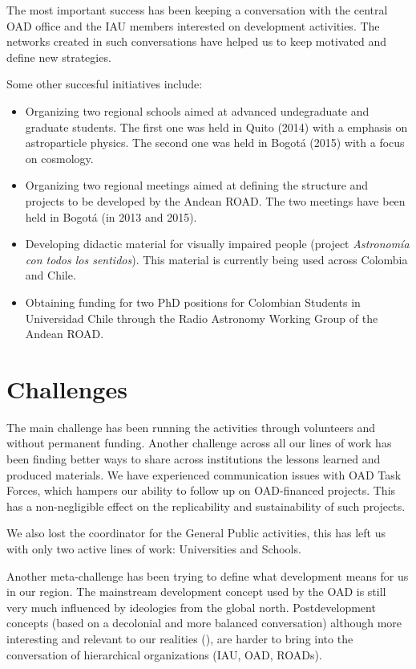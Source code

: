 \documentclass{iau}
\begin{document}
The most important success has been keeping a conversation with the
central OAD office and the IAU members interested on development
activities. 
The networks created in such conversations have helped us to keep
motivated and define new strategies.

Some other succesful initiatives include:
\begin{itemize}
\item Organizing two regional schools aimed at advanced undegraduate
  and graduate students. The first one was held in Quito (2014) with a
  emphasis on astroparticle physics. The second one was held in Bogot\'a (2015)
  with a focus on cosmology.
\item Organizing two regional meetings aimed at defining the structure
  and projects to be developed by the Andean ROAD. The two meetings
  have been held in Bogot\'a (in 2013 and 2015). 
\item Developing didactic material for visually impaired people
(project \emph{Astronom\'ia con todos los sentidos}). This
  material is currently being used across Colombia and Chile.
\item Obtaining funding for two PhD positions for Colombian Students
in Universidad Chile through the Radio Astronomy Working Group of the
Andean ROAD. 
\end{itemize}



\section{Challenges}

The main challenge has been running the activities through volunteers
and without permanent funding. 
Another challenge across all our lines of work has been
finding better ways to share across institutions the lessons learned
and produced materials. 
We have experienced communication issues with OAD Task Forces,
which hampers our ability to follow up on OAD-financed projects. 
This 
has a non-negligible effect on the replicability and sustainability of such projects.

We also lost the coordinator for the General Public activities, this
has left us with only two active lines of work: Universities and
Schools. 

Another meta-challenge has been trying to define what development means for
us in our region. 
The mainstream development concept used by the OAD is still very much
influenced by ideologies from the global north.
Postdevelopment concepts (based on a decolonial and more balanced
conversation) although more interesting and relevant to our realities
(\cite{Grosfoguel02}), are harder to bring into the conversation of
hierarchical organizations (IAU, OAD, ROADs).  
\end{document}
